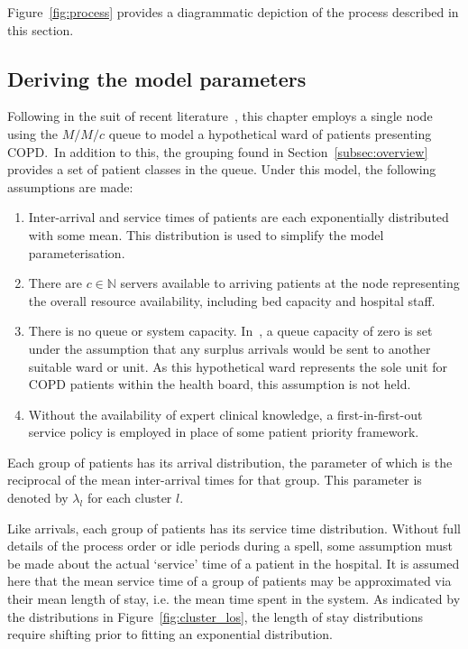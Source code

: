 Figure~\ref{fig:process} provides a diagrammatic depiction of the process
described in this section.


\subsection{Deriving the model parameters}\label{subsec:derive}

Following in the suit of recent literature~\cite{Steins2013,Williams2015}, this
chapter employs a single node using the \(M/M/c\) queue to model a hypothetical
ward of patients presenting COPD.\ In addition to this, the grouping found in
Section~\ref{subsec:overview} provides a set of patient classes in the queue.
Under this model, the following assumptions are made:

\begin{enumerate}
    \item Inter-arrival and service times of patients are each exponentially
        distributed with some mean. This distribution is used to simplify the
        model parameterisation.
    \item There are \(c \in \mathbb{N}\) servers available to arriving patients
        at the node representing the overall resource availability, including
        bed capacity and hospital staff.
    \item There is no queue or system capacity. In~\cite{Williams2015}, a
        queue capacity of zero is set under the assumption that any surplus
        arrivals would be sent to another suitable ward or unit. As this
        hypothetical ward represents the sole unit for COPD patients within the
        health board, this assumption is not held.
    \item Without the availability of expert clinical knowledge, a
        first-in-first-out service policy is employed in place of some patient
        priority framework.
\end{enumerate}

Each group of patients has its arrival distribution, the parameter of which is
the reciprocal of the mean inter-arrival times for that group. This parameter
is denoted by \(\lambda_l\) for each cluster \(l\).

Like arrivals, each group of patients has its service time distribution.
Without full details of the process order or idle periods during a spell, some
assumption must be made about the actual `service' time of a patient in the
hospital. It is assumed here that the mean service time of a group of patients
may be approximated via their mean length of stay, i.e. the mean time spent in
the system. As indicated by the distributions in Figure~\ref{fig:cluster_los},
the length of stay distributions require shifting prior to fitting an
exponential distribution.

